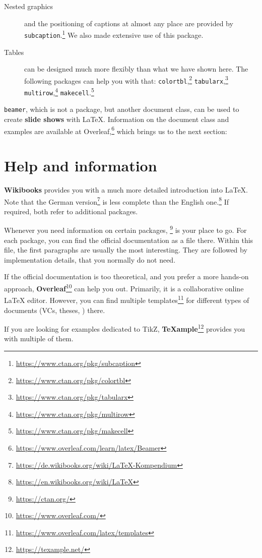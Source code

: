 \begin{description}
	\item[Nested graphics]
		and the positioning of captions at almost any place are provided by  
		\texttt{subcaption}.\footnote{\url{https://www.ctan.org/pkg/subcaption}}
		We also made extensive use of this package.
	\item[Tables]
		can be designed much more flexibly than what we have shown here. 
		The following packages can help you with that:
		\texttt{colortbl},\footnote{\url{https://www.ctan.org/pkg/colortbl}}
		\texttt{tabularx},\footnote{\url{https://www.ctan.org/pkg/tabularx}}
		\texttt{multirow},\footnote{\url{https://www.ctan.org/pkg/multirow}}
		\texttt{makecell}.\footnote{\url{https://www.ctan.org/pkg/makecell}}
\end{description}

\noindent \texttt{beamer}, which is not a package, but another document class, can be used to create \textbf{slide shows}
with \LaTeX{}. Information on the document class and examples are available at Overleaf,\footnote{\url{https://www.overleaf.com/learn/latex/Beamer}} which brings us to the next section:

\section{Help and information}

\textbf{Wikibooks} provides you with a much more detailed introduction into \LaTeX{}. Note that the German version\footnote{\url{https://de.wikibooks.org/wiki/LaTeX-Kompendium}} is less complete than the English one.\footnote{\url{https://en.wikibooks.org/wiki/LaTeX}}
If required, both refer to additional packages.

Whenever you need information on certain packages, \footnote{\url{https://ctan.org/}} is your place to go. 
For each package, you can find the official documentation as a  file there.
Within this file, the first paragraphs are usually the most interesting. They are 
followed by implementation details, that you normally do not need.

If the official documentation is too theoretical, and you prefer a more hands-on approach, \textbf{Overleaf}\footnote{\url{https://www.overleaf.com/}} can help you out.
Primarily, it is a collaborative online \LaTeX{} editor. However, you can find multiple templates\footnote{\url{https://www.overleaf.com/latex/templates}} for different types of documents (VCs, theses, \textellipsis) there.

If you are looking for examples dedicated to TikZ, \textbf{\TeX{}ample}\footnote{\url{https://texample.net/}} provides you with multiple of them.

